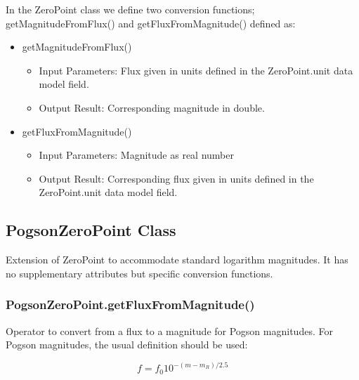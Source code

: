 \documentclass[11pt,a4paper]{ivoa}
\begin{document}
In the ZeroPoint class we define two conversion functions; 
getMagnitudeFromFlux() and getFluxFromMagnitude() defined as:\par

\begin{itemize}
	\item getMagnitudeFromFlux()\par

\begin{itemize}
	\item{Input Parameters: Flux given in units defined in the 
	ZeroPoint.unit data model field.\par}

	\item{Output Result: Corresponding magnitude in double.\par}


\vspace{\baselineskip}

\end{itemize}
	\item  getFluxFromMagnitude()\par

\begin{itemize}
	\item{Input Parameters: Magnitude as real number\par}

	\item{Output Result: Corresponding flux given in units defined in 
	the ZeroPoint.unit data model field.}
\end{itemize}
\end{itemize}
\par


\subsection{PogsonZeroPoint Class}
Extension of ZeroPoint to accommodate standard logarithm magnitudes. It 
has no supplementary attributes but specific conversion functions.
\par

\subsubsection{PogsonZeroPoint.getFluxFromMagnitude()}
Operator to convert from a flux to a magnitude for Pogson magnitudes. For 
Pogson magnitudes, the usual definition should be used:
\par
\begin{equation} \label{eq:25}
f = f_0 10^{-(m-m_R)/2.5}
\end{equation}
\end{document}
